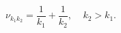 \begin{equation}
\nu _{k_{1} k_{2}}=\frac{1}{k_{1}}+\frac{1}{k_{2}},
\ \ \ \ \ k_{2}>k_{1}.
\end{equation}

